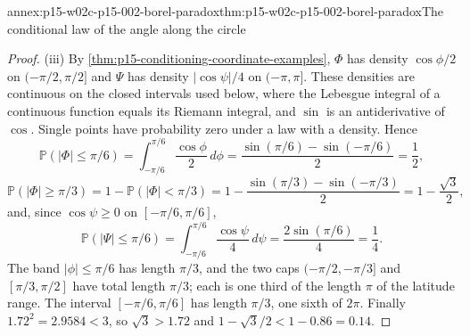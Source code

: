\begin{annexitem}{annex:p15-w02c-p15-002-borel-paradox}{thm:p15-w02c-p15-002-borel-paradox}{The conditional law of the angle along the circle}
\begin{proof}
(iii) By \cref{thm:p15-conditioning-coordinate-examples}, \(\Phi\) has
density \(\cos\phi/2\) on \((-\pi/2,\pi/2]\) and \(\Psi\) has density
\(|\cos\psi|/4\) on \((-\pi,\pi]\). These densities are continuous on the
closed intervals used below, where the Lebesgue integral of a continuous
function equals its Riemann integral, and \(\sin\) is an antiderivative of
\(\cos\). Single points have probability zero under a law with a density.
Hence
\[
 \mathbb P(|\Phi|\leq\pi/6)=\int_{-\pi/6}^{\pi/6}\frac{\cos\phi}2\,d\phi
 =\frac{\sin(\pi/6)-\sin(-\pi/6)}2=\frac12,
\]
\[
 \mathbb P(|\Phi|\geq\pi/3)=1-\mathbb P(|\Phi|<\pi/3)
 =1-\frac{\sin(\pi/3)-\sin(-\pi/3)}2=1-\frac{\sqrt3}2,
\]
and, since \(\cos\psi\geq0\) on \([-\pi/6,\pi/6]\),
\[
 \mathbb P(|\Psi|\leq\pi/6)=\int_{-\pi/6}^{\pi/6}\frac{\cos\psi}4\,d\psi
 =\frac{2\sin(\pi/6)}4=\frac14 .
\]
The band \(|\phi|\leq\pi/6\) has length \(\pi/3\), and the two caps
\((-\pi/2,-\pi/3]\) and \([\pi/3,\pi/2]\) have total length \(\pi/3\);
each is one third of the length \(\pi\) of the latitude range. The
interval \([-\pi/6,\pi/6]\) has length \(\pi/3\), one sixth of \(2\pi\).
Finally \(1.72^2=2.9584<3\), so \(\sqrt3>1.72\) and
\(1-\sqrt3/2<1-0.86=0.14\).
\end{proof}
\end{annexitem}

